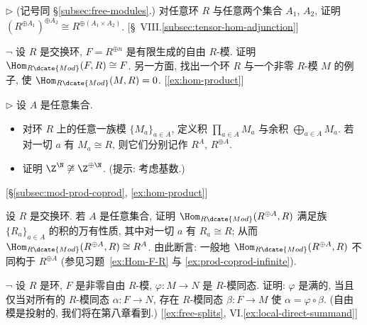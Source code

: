 \begin{prob}
\label{ex:double-sum}
$\triangleright$ (记号同 \S\ref{subsec:free-modules}.) 对任意环 $R$ 与任意两个集合 $A_1$, $A_2$, 证明 $(R^{\oplus A_1})^{\oplus A_2} \cong R^{\oplus(A_1 \times A_2)}$. [\S~VIII.\ref{subsec:tensor-hom-adjunction}]
\end{prob}

\begin{prob}
\label{ex:Hom-F-R}
$\neg$ 设 $R$ 是交换环, $F = R^{\oplus n}$ 是有限生成的自由 $R$-模. 证明 $\Hom_{R\dcate{Mod}}(F, R) \cong F$. 另一方面, 找出一个环 $R$ 与一个非零 $R$-模 $M$ 的例子, 使 $\Hom_{R\dcate{Mod}}(M, R) = 0$. [\ref{ex:hom-product}]
\end{prob}

\begin{prob}
\label{ex:prod-coprod-infinite}
$\triangleright$ 设 $A$ 是任意集合.
\begin{itemize}
	\item 对环 $R$ 上的任意一族模 $\{M_a\}_{a \in A}$, 定义积 $\prod_{a \in A} M_a$ 与余积 $\bigoplus_{a \in A} M_a$. 若对一切 $a$ 有 $M_a \cong R$, 则它们分别记作 $R^A$, $R^{\oplus A}$.
	\item 证明 $\Z^{\N} \not\cong \Z^{\oplus \N}$. (提示: 考虑基数.)
\end{itemize}
[\S\ref{subsec:mod-prod-coprod}, \ref{ex:hom-product}]
\end{prob}

\begin{prob}
\label{ex:hom-product}
设 $R$ 是交换环. 若 $A$ 是任意集合, 证明 $\Hom_{R\dcate{Mod}}(R^{\oplus A}, R)$ 满足族 $\{R_a\}_{a \in A}$ 的积的万有性质, 其中对一切 $a$ 有 $R_a \cong R$; 从而 $\Hom_{R\dcate{Mod}}(R^{\oplus A}, R) \cong R^A$. 由此断言: 一般地 $\Hom_{R\dcate{Mod}}(R^{\oplus A}, R)$ 不同构于 $R^{\oplus A}$ (参见习题~\ref{ex:Hom-F-R} 与 \ref{ex:prod-coprod-infinite}).
\end{prob}

\begin{prob}
\label{ex:projective-free}
$\neg$ 设 $R$ 是环, $F$ 是非零自由 $R$-模, $\varphi : M \to N$ 是 $R$-模同态. 证明: $\varphi$ 是满的, 当且仅当对所有的 $R$-模同态 $\alpha : F \to N$, 存在 $R$-模同态 $\beta : F \to M$ 使 $\alpha = \varphi \circ \beta$. (自由模是投射的, 我们将在第八章看到.) [\ref{ex:free-splits}, VI.\ref{ex:local-direct-summand}]
\end{prob}

